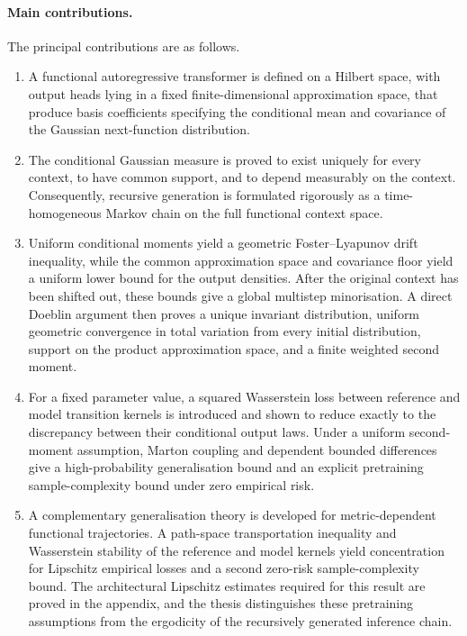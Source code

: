 \paragraph{Main contributions.}
The principal contributions are as follows.
\begin{enumerate}
    \item A functional autoregressive transformer is defined on a Hilbert space, with output heads lying in a fixed finite-dimensional approximation space, that produce basis coefficients specifying the conditional mean and covariance of the Gaussian next-function distribution.

    \item The conditional Gaussian measure is proved to exist uniquely for every context, to have common support, and to depend measurably on the context. Consequently, recursive generation is formulated rigorously as a time-homogeneous Markov chain on the full functional context space.

    \item Uniform conditional moments yield a geometric Foster--Lyapunov drift inequality, while the common approximation space and covariance floor yield a uniform lower bound for the output densities. After the original context has been shifted out, these bounds give a global multistep minorisation. A direct Doeblin argument then proves a unique invariant distribution, uniform geometric convergence in total variation from every initial distribution, support on the product approximation space, and a finite weighted second moment.

    \item For a fixed parameter value, a squared Wasserstein loss between reference and model transition kernels is introduced and shown to reduce exactly to the discrepancy between their conditional output laws. Under a uniform second-moment assumption, Marton coupling and dependent bounded differences give a high-probability generalisation bound and an explicit pretraining sample-complexity bound under zero empirical risk.

    \item A complementary generalisation theory is developed for metric-dependent functional trajectories. A path-space transportation inequality and Wasserstein stability of the reference and model kernels yield concentration for Lipschitz empirical losses and a second zero-risk sample-complexity bound. The architectural Lipschitz estimates required for this result are proved in the appendix, and the thesis distinguishes these pretraining assumptions from the ergodicity of the recursively generated inference chain.


\end{enumerate}
